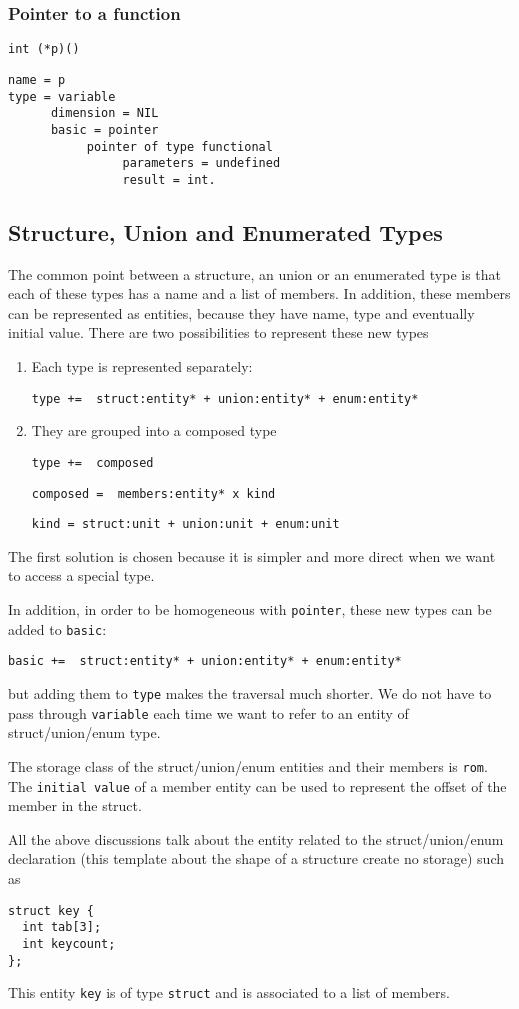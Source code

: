 \documentclass[a4paper]{article}
\begin{document}
\subsubsection{Pointer to a function}
\verb/int (*p)()/
\begin{verbatim}
name = p
type = variable
      dimension = NIL
      basic = pointer
           pointer of type functional
                parameters = undefined
                result = int.
\end{verbatim}
\subsection{Structure, Union and Enumerated Types} 
The common point between  a structure, an union or an enumerated type is that each of these
types has a name and a list of members. In addition, these 
 members can be represented as entities, because they have name,
type and eventually initial value. There are two possibilities to
represent these new types
\begin{enumerate}
\item Each type is represented separately:

\verb/type +=  struct:entity* + union:entity* + enum:entity*/ 
\item They are grouped into a composed type

\verb/type +=  composed/ 

\verb/composed =  members:entity* x kind/

\verb/kind = struct:unit + union:unit + enum:unit/
\end{enumerate}
The first solution is chosen because it is simpler and more direct when
we want to access a special type. 

In addition, in order to be homogeneous with \verb/pointer/, these
new types can be added to \verb/basic/:

\verb/basic +=  struct:entity* + union:entity* + enum:entity*/ 

but adding them to \verb/type/ makes the traversal much shorter. We do
not have to pass through \verb/variable/ each time we want to refer to an
entity of struct/union/enum type. 

The storage class of the struct/union/enum entities and their
members is \verb/rom/. The \verb/initial value/ of a member entity can be used to represent
the offset of the member in the struct.   

All the above discussions talk about the entity related to the
struct/union/enum declaration (this template about the shape of a
structure create no storage) such as 
\begin{verbatim}
struct key {
  int tab[3];
  int keycount;
};
\end{verbatim}
This entity \verb/key/ is of type \verb/struct/ and is associated to a list
of members.\\
\end{document}

